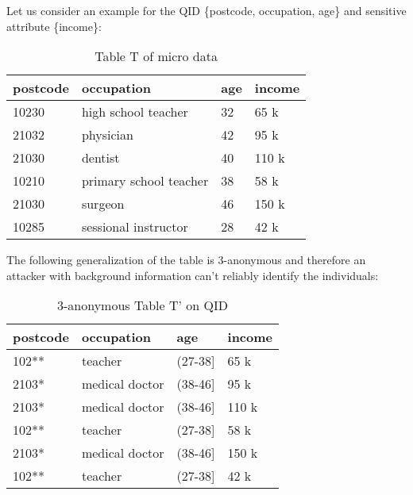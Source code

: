 \begin{example}[3-Anonymization] \label{3ano}
Let us consider an example for the QID \{postcode, occupation, age\} and sensitive attribute \{income\}:
\begin{table}[H]
\centering
\begin{tabular}{@{}llll@{}}
\toprule
postcode & occupation             & age & income \\ \midrule
10230    & high school teacher    & 32  & 65 k   \\
21032    & physician              & 42  & 95 k   \\
21030    & dentist                & 40  & 110 k  \\
10210    & primary school teacher & 38  & 58 k   \\
21030    & surgeon                & 46  & 150 k  \\
10285    & sessional instructor   & 28  & 42 k   \\ \bottomrule
\end{tabular}
\caption{Table T of micro data}
\label{vulnerableData}
\end{table}
\noindent The following generalization of the table is 3-anonymous and therefore an attacker with  background information can't reliably identify the individuals:
\begin{table}[H]
\centering
\begin{tabular}{@{}llll@{}}
\toprule
postcode & occupation     & age       & income \\ \midrule
102**    & teacher        & (27-38{]} & 65 k   \\
2103*    & medical doctor & (38-46{]} & 95 k   \\
2103*    & medical doctor & (38-46{]} & 110 k  \\
102**    & teacher        & (27-38{]} & 58 k   \\
2103*    & medical doctor & (38-46{]} & 150 k  \\
102**    & teacher        & (27-38{]} & 42 k   \\ \bottomrule
\end{tabular}
\caption{3-anonymous Table T' on QID}
\label{genData}
\end{table}

\end{example}

